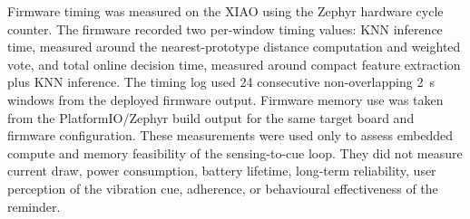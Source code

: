Firmware timing was measured on the XIAO using the Zephyr hardware cycle counter. The firmware recorded two per-window timing values: KNN inference time, measured around the nearest-prototype distance computation and weighted vote, and total online decision time, measured around compact feature extraction plus KNN inference. The timing log used 24 consecutive non-overlapping 2~s windows from the deployed firmware output. Firmware memory use was taken from the PlatformIO/Zephyr build output for the same target board and firmware configuration. These measurements were used only to assess embedded compute and memory feasibility of the sensing-to-cue loop. They did not measure current draw, power consumption, battery lifetime, long-term reliability, user perception of the vibration cue, adherence, or behavioural effectiveness of the reminder.
